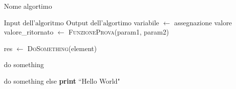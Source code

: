 \begin{algorithm}
\caption{Nome algortimo}\label{algo:name}
\begin{algorithmic}[1]
\Require $\text{Input dell'algoritmo}$
\Ensure $\text{Output dell'algortimo}$
\State variabile $\gets$ assegnazione valore
\State valore\_ritornato $\gets$ \textsc{Funzione}\textsc{Prova}(param1, param2)

\State res $\gets$ \textsc{Do}\textsc{Something}(element)
\EndFor

\State do something

\State do something else
\Else
\State \textbf{print} ``Hello World"
\EndIf
\end{algorithmic}
\end{algorithm}